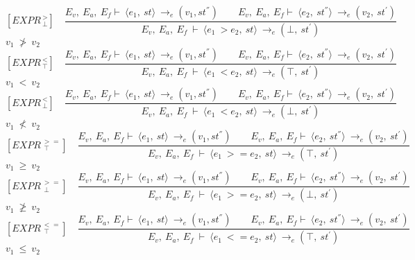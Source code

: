 \[	
[EXPR^{\ >}_{\ \bot}] \quad	
\dfrac{E_v, \ E_a, \ E_f \vdash \ \langle e_1, \ st \rangle \ \rightarrow_e (v_1, st^{''}) \qquad E_v, \ E_a, \ E_f \vdash \ \langle e_2, \ st^{''} \rangle \ \rightarrow_e (v_2, \ st^{'})}{E_v, \ E_a, \ E_f \ \vdash \ \langle e_1 \ > e_2, \ st \rangle \ \rightarrow_e (\bot, \ st^{'})}
\]
\begin{math}		
	v_1 \ \not> \ v_2		
\end{math} 
\[	
[EXPR^{\ <}_{\ \top}] \quad	
\dfrac{E_v, \ E_a, \ E_f \vdash \ \langle e_1, \ st \rangle \ \rightarrow_e (v_1, st^{''}) \qquad E_v, \ E_a, \ E_f \vdash \ \langle e_2, \ st^{''} \rangle \ \rightarrow_e (v_2, \ st^{'})}{E_v, \ E_a, \ E_f \ \vdash \ \langle e_1 \ < e_2, \ st \rangle \ \rightarrow_e (\top, \ st^{'})}
\]
\begin{math}		
	v_1 \ < \ v_2		
\end{math} 
\[	
[EXPR^{\ <}_{\ \bot}] \quad	
\dfrac{E_v, \ E_a, \ E_f \vdash \ \langle e_1, \ st \rangle \ \rightarrow_e (v_1, st^{''}) \qquad E_v, \ E_a, \ E_f \vdash \ \langle e_2, \ st^{''} \rangle \ \rightarrow_e (v_2, \ st^{'})}{E_v, \ E_a, \ E_f \ \vdash \ \langle e_1 \ < e_2, \ st \rangle \ \rightarrow_e (\bot, \ st^{'})}	
\]
\begin{math}		
	v_1 \ \not< \ v_2		
\end{math}
\[	
[EXPR^{\ >=}_{\ \ \top}] \quad	
\dfrac{E_v, \ E_a, \ E_f \vdash \ \langle e_1, \ st \rangle \ \rightarrow_e (v_1, st^{''}) \qquad E_v, \ E_a, \ E_f \vdash \ \langle e_2, \ st^{''} \rangle \ \rightarrow_e (v_2, \ st^{'})}{E_v, \ E_a, \ E_f \ \vdash \ \langle e_1 \ >= e_2, \ st \rangle \ \rightarrow_e (\top, \ st^{'})}	
\]
\begin{math}		
	v_1 \ \ge \ v_2		
\end{math} 
\[	
[EXPR^{\ >=}_{\ \ \bot}] \quad	
\dfrac{E_v, \ E_a, \ E_f \vdash \ \langle e_1, \ st \rangle \ \rightarrow_e (v_1, st^{''}) \qquad E_v, \ E_a, \ E_f \vdash \ \langle e_2, \ st^{''} \rangle \ \rightarrow_e (v_2, \ st^{'})}{E_v, \ E_a, \ E_f \ \vdash \ \langle e_1 \ >= e_2, \ st \rangle \ \rightarrow_e (\bot, \ st^{'})}	
\]
\begin{math}		
	v_1 \ \ngeq \ v_2		
\end{math}
\[
[EXPR^{\ <=}_{\ \ \top}] \quad
\dfrac{E_v, \ E_a, \ E_f \vdash \ \langle e_1, \ st \rangle \ \rightarrow_e (v_1, st^{''}) \qquad E_v, \ E_a, \ E_f \vdash \ \langle e_2, \ st^{''} \rangle \ \rightarrow_e (v_2, \ st^{'})}{E_v, \ E_a, \ E_f \ \vdash \ \langle e_1 \ <= e_2, \ st \rangle \ \rightarrow_e (\top, \ st^{'})}
\]
\begin{math}		
	v_1 \ \le \ v_2		
\end{math} 

